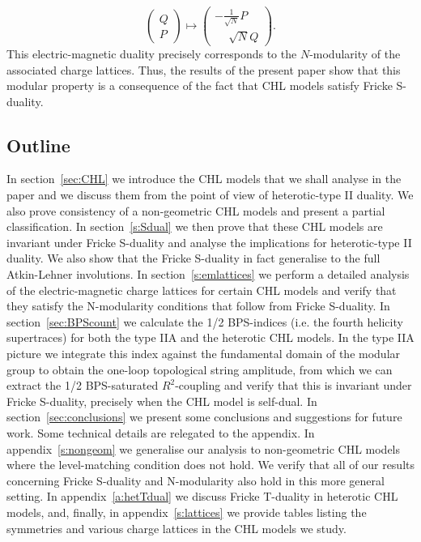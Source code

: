 \documentclass[a4paper,11pt]{article}
\numberwithin{equation}{section}
\def\be{\begin{equation}}
\def\ee{\end{equation}}
\begin{document}
\be
\left(\begin{array}{c} Q \\ P \end{array}\right) \longmapsto \left(\begin{array}{c} -\frac{1}{\sqrt{N}} P \\ \phantom{-}\sqrt{N} Q \end{array}\right).
\ee
This electric-magnetic duality precisely corresponds to the $N$-modularity of the associated charge lattices. Thus, the results of the present paper show that this modular property is a consequence of the fact that CHL models satisfy Fricke S-duality.
\label{sec:moonshine}

\subsection{Outline}
In section~\ref{sec:CHL} we introduce the CHL models that we shall analyse in the paper and we discuss them from the point of view of heterotic-type II duality. We also prove consistency 
of a non-geometric CHL models and present a partial classification. In section~\ref{s:Sdual} we then prove that these CHL models are invariant under Fricke S-duality and analyse the implications for heterotic-type II duality. We also show that the Fricke S-duality in fact generalise to the full Atkin-Lehner involutions. In section~\ref{s:emlattices} we perform a detailed analysis of the electric-magnetic charge lattices for certain CHL models and verify that they satisfy the N-modularity conditions that follow from Fricke S-duality. In section~\ref{sec:BPScount} we calculate the 1/2 BPS-indices (i.e. the fourth helicity supertraces) for both the type IIA and the heterotic CHL models. In the type IIA picture we integrate this index against the fundamental domain of the modular group to obtain the one-loop topological string amplitude, from which we can extract the 1/2 BPS-saturated $R^2$-coupling and verify that this is invariant under Fricke S-duality, precisely when the CHL model is self-dual. In section~\ref{sec:conclusions} we present some conclusions and suggestions for future work. Some technical details are relegated to the appendix. In appendix~\ref{s:nongeom} we generalise our analysis to non-geometric CHL models where the level-matching condition does not hold. We verify that all of our results concerning Fricke S-duality and N-modularity also hold in this more general setting. In appendix~\ref{a:hetTdual} we discuss Fricke T-duality in heterotic CHL models, and, finally, in appendix~\ref{s:lattices} we provide tables listing the symmetries and various charge lattices in the CHL models we study. 
\end{document}
